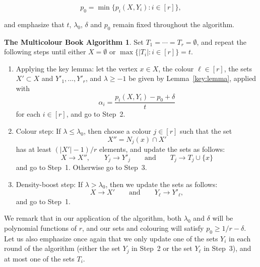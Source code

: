 \documentclass[12pt,reqno]{amsart}
\theoremstyle{definition}
\newtheorem*{RBalg}{The Multicolour Book Algorithm}
\theoremstyle{remark}
\renewcommand{\le}{\leqslant}
\renewcommand{\ge}{\geqslant}
\renewcommand{\to}{\rightarrow}
\begin{document}
%
\begin{equation*}
	p_0 = \min\big\{ p_i(X,Y_i) : i \in [r] \big\},
\end{equation*}
%

and emphasize that \(t\), \(\lambda_0\), \(\delta\) and \(p_0\) remain fixed throughout the algorithm.

%
\begin{RBalg}

	Set \(T_1 = \cdots = T_r = \emptyset\), and repeat the following steps until either \(X = \emptyset\) or \(\max\big\{ |T_i| : i \in [r] \big\} = t\).
	\begin{enumerate}[label=\arabic*., ref=\arabic*]
		\item\label{Alg:Step1} Applying the key lemma: let the vertex \(x \in X\), the colour \(\ell \in [r]\), the sets \(X' \subset X\) and \(Y'_1,\ldots,Y'_r\), and \(\lambda \ge -1\) be given by Lemma~\ref{key:lemma}, applied with
		\begin{equation}
			\label{def:alpha}
			\alpha_i = \frac{p_i(X,Y_i) - p_0 + \delta}{t}
		\end{equation}
		for each \(i \in [r]\), and go to Step~2.\smallskip
		\item\label{Alg:Step2} Colour step: If \(\lambda \le \lambda_0\), then choose a colour \(j \in [r]\) such that the set
		\begin{equation*}
			X'' = N_j(x) \cap X'
		\end{equation*}
		has at least \((|X'| - 1)/r\) elements, and update the sets as follows:
		\begin{equation*}
			X \to X'', \qquad Y_j \to Y'_j \qquad \text{and} \qquad T_j \to T_j \cup \{x\}
		\end{equation*}
		and go to Step~1. Otherwise go to Step~3.\smallskip
		\item\label{Alg:Step3} Density-boost step: If \(\lambda > \lambda_0\), then we update the sets as follows:
		\begin{equation*}
			X \to X' \qquad \text{and} \qquad Y_\ell \to Y'_\ell,
		\end{equation*}
		and go to Step~1.
	\end{enumerate}
%
\end{RBalg}
%

We remark that in our application of the algorithm, both \(\lambda_0\) and \(\delta\) will be polynomial functions of \(r\), and our sets and colouring will satisfy \(p_0 \ge 1/r - \delta\). Let us also emphasize once again that we only update one of the sets \(Y_i\) in each round of the algorithm (either the set \(Y_j\) in Step~2 or the set \(Y_\ell\) in Step~3), and at most one of the sets \(T_i\).
\end{document}
